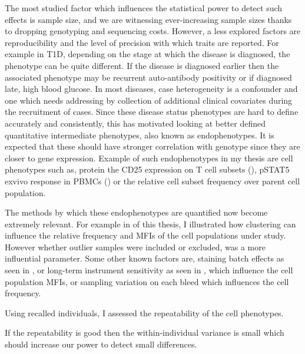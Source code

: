 The most studied factor which influences the statistical power to detect such effects is sample size, and we are witnessing ever-increasing sample sizes thanks to dropping genotyping and sequencing costs.
However, a less explored factors are reproducibility and the level of precision with which traits are reported.
For example in \gls{T1D}, depending on the stage at which the disease is diagnosed, the phenotype can be quite different.
If the disease is diagnosed earlier then the associated phenotype may be recurrent auto-antibody positivity or if diagnosed late, high blood glucose.
In most diseases, case heterogeneity is a confounder and one which needs addressing by collection of additional clinical covariates during the recruitment of cases.
Since these disease status phenotypes are hard to define accurately and consistently,
this has motivated looking at better defined quantitative intermediate phenotypes, also known as endophenotypes.
It is expected that these should have stronger correlation with genotype since they are closer to gene expression.
Example of such endophenotypes in my thesis are cell phenotypes such as, protein the CD25 expression on T cell subsets (), pSTAT5 exvivo response in \glspl{PBMC} () or the relative cell subset frequency over parent cell population.

The methods by which these endophenotypes are quantified now become extremely relevant.
For example in  of this thesis, I illustrated how clustering can influence the relative frequency and MFIs of the cell populations under study.
However whether outlier samples were included or excluded, was a more influential parameter.
Some other known factors are, staining batch effects as seen in , or long-term instrument sensitivity as seen in , which influence the cell population \glspl{MFI}, or sampling variation on each bleed which influences the cell frequency.

Using recalled individuals, I assessed the repeatability of the cell phenotypes.

If the repeatability is good then the within-individual variance is small which should increase our power to detect small differences.

